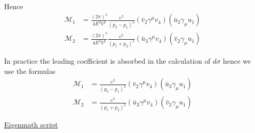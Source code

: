 Hence
\begin{align*}
\mathcal M_1&=\frac{(2\pi)^4}{4E^2V^2}
\frac{e^2}{(p_3-p_1)^2}
(\bar v_2\gamma^\mu v_4)(\bar u_3\gamma_\mu u_1)
\\[1ex]
\mathcal M_2&=\frac{(2\pi)^4}{4E^2V^2}
\frac{e^2}{(p_1+p_2)^2}
(\bar u_3\gamma^\mu v_4)(\bar v_2\gamma_\mu u_1)
\end{align*}

In practice the leading coefficient is absorbed in the calculation of $d\sigma$
hence we use the formulas
\begin{align*}
\mathcal M_1&=
\frac{e^2}{(p_3-p_1)^2}
(\bar v_2\gamma^\mu v_4)(\bar u_3\gamma_\mu u_1)
\\[1ex]
\mathcal M_2&=
\frac{e^2}{(p_1+p_2)^2}
(\bar u_3\gamma^\mu v_4)(\bar v_2\gamma_\mu u_1)
\end{align*}

\href{https://georgeweigt.github.io/examples/bhabha-scattering-2-demo.html}{Eigenmath script}



